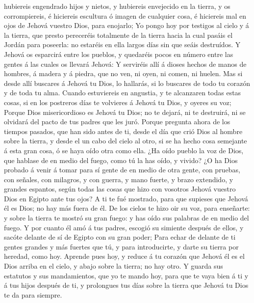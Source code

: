 hubiereis engendrado hijos y nietos, y hubiereis envejecido en la
tierra, y os corrompiereis, é hiciereis escultura ó imagen de cualquier
cosa, é hiciereis mal en ojos de Jehová vuestro Dios, para enojarlo;
 Yo pongo hoy por testigos al cielo y á la tierra, que
presto pereceréis totalmente de la tierra hacia la cual pasáis el Jordán
para poseerla: no estaréis en ella largos días sin que seáis destruídos.
 Y Jehová os esparcirá entre los pueblos, y quedaréis pocos
en número entre las gentes á las cuales os llevará Jehová: 
Y serviréis allí á dioses hechos de manos de hombres, á madera y á
piedra, que no ven, ni oyen, ni comen, ni huelen.  Mas si
desde allí buscares á Jehová tu Dios, lo hallarás, si lo buscares de
todo tu corazón y de toda tu alma.  Cuando estuviereis en
angustia, y te alcanzaren todas estas cosas, si en los postreros días te
volvieres á Jehová tu Dios, y oyeres su voz;  Porque Dios
misericordioso es Jehová tu Dios; no te dejará, ni te destruirá, ni se
olvidará del pacto de tus padres que les juró.  Porque
pregunta ahora de los tiempos pasados, que han sido antes de ti, desde
el día que crió Dios al hombre sobre la tierra, y desde el un cabo del
cielo al otro, si se ha hecho cosa semejante á esta gran cosa, ó se haya
oído otra como ella.  ¿Ha oído pueblo la voz de Dios, que
hablase de en medio del fuego, como tú la has oído, y vivido?
 ¿O ha Dios probado á venir á tomar para sí gente de en
medio de otra gente, con pruebas, con señales, con milagros, y con
guerra, y mano fuerte, y brazo extendido, y grandes espantos, según
todas las cosas que hizo con vosotros Jehová vuestro Dios en Egipto ante
tus ojos?  A ti te fué mostrado, para que supieses que
Jehová él es Dios; no hay más fuera de él.  De los cielos
te hizo oir su voz, para enseñarte: y sobre la tierra te mostró su gran
fuego: y has oído sus palabras de en medio del fuego.  Y
por cuanto él amó á tus padres, escogió su simiente después de ellos, y
sacóte delante de sí de Egipto con su gran poder;  Para
echar de delante de ti gentes grandes y más fuertes que tú, y para
introducirte, y darte su tierra por heredad, como hoy. 
Aprende pues hoy, y reduce á tu corazón que Jehová él es el Dios arriba
en el cielo, y abajo sobre la tierra; no hay otro.  Y
guarda sus estatutos y sus mandamientos, que yo te mando hoy, para que
te vaya bien á ti y á tus hijos después de ti, y prolongues tus días
sobre la tierra que Jehová tu Dios te da para siempre.

